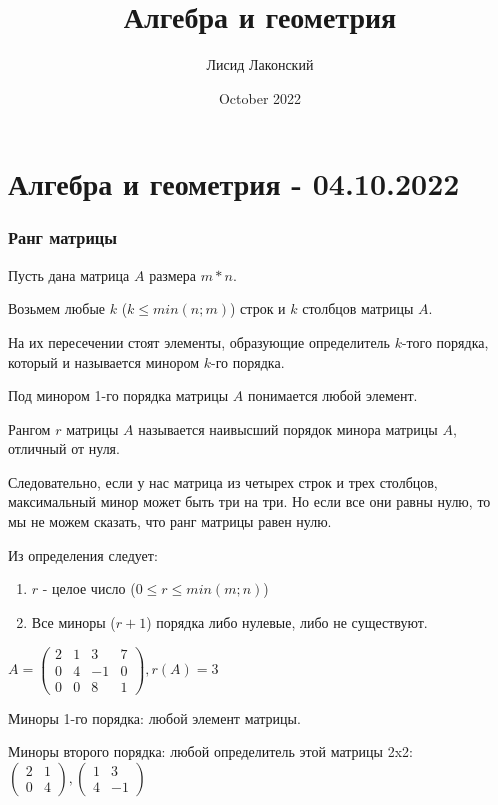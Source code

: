\documentclass{article}
\title{Алгебра и геометрия}
\author{Лисид Лаконский}
\date{October 2022}
\begin{document}
\maketitle

\section{Алгебра и геометрия - 04.10.2022}

\subsubsection{Ранг матрицы}

Пусть дана матрица $A$ размера $m * n$.

Возьмем любые $k$ ($k \le min(n;m)$) строк и $k$ столбцов матрицы $A$.

На их пересечении стоят элементы, образующие определитель $k$-того порядка, который и называется минором $k$-го порядка.

Под минором 1-го порядка матрицы $A$ понимается любой элемент.

Рангом $r$ матрицы $A$ называется наивысший порядок минора матрицы $A$, отличный от нуля.

Следовательно, если у нас матрица из четырех строк и трех столбцов, максимальный минор может быть три на три. Но если все они равны нулю, то мы не можем сказать, что ранг матрицы равен нулю.

Из определения следует:

\begin{enumerate}
    \item $r$ - целое число ($0 \le r \le min(m;n)$)
    \item Все миноры ($r + 1$) порядка либо нулевые, либо не существуют. 
\end{enumerate}

$A = \begin{pmatrix}
    2 & 1 & 3 & 7 \\
    0 & 4 & -1 & 0 \\
    0 & 0 & 8 & 1
\end{pmatrix}, r(A) = 3$

Миноры 1-го порядка: любой элемент матрицы. 

Миноры второго порядка: любой определитель этой матрицы 2x2: $\begin{pmatrix} 2 & 1 \\ 0 & 4 \end{pmatrix}, \begin{pmatrix} 1 & 3 \\ 4 & -1 \end{pmatrix}$
\end{document}
